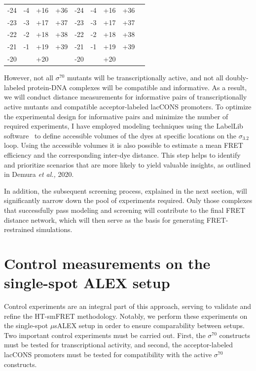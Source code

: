 \begin{table}[]
\begin{tabular}{@{}lllllllll@{}}
-24     & -4      & +16     & +36     & -24      & -4       & +16      & +36      &                         \\
-23     & -3      & +17     & +37     & -23      & -3       & +17      & +37      &                         \\
-22     & -2      & +18     & +38     & -22      & -2       & +18      & +38      &                         \\
-21     & -1      & +19     & +39     & -21      & -1       & +19      & +39      &                         \\
-20     &         & +20     &         & -20      &          & +20      &          &                         \\
\bottomrule
\end{tabular}
\end{table}

However, not all $\sigma^{70}$ mutants will be transcriptionally active, and not all doubly-labeled protein-DNA complexes will be compatible and informative. 
As a result, we will conduct distance measurements for informative pairs of transcriptionally active mutants and compatible acceptor-labeled \ac{lacCONS} promoters.
To optimize the experimental design for informative pairs and minimize the number of required experiments, I have employed modeling techniques using the LabelLib software~\cite{dimura_NatComm_2020} to define accessible volumes of the dyes at specific locations on the $\sigma_{3.2}$ loop.
Using the accessible volumes it is also possible to estimate a mean FRET efficiency and the corresponding inter-dye distance. 
This step helps to identify and prioritize scenarios that are more likely to yield valuable insights, as outlined in Demura \textit{et al.,} 2020.~\cite{dimura_NatComm_2020}

In addition, the subsequent screening process, explained in the next section, will significantly narrow down the pool of experiments required.
Only those complexes that successfully pass modeling and screening will contribute to the final FRET distance network, which will then serve as the basis for generating FRET-restrained simulations.

\section{Control measurements on the single-spot ALEX setup}
\label{se:controls_exp}

Control experiments are an integral part of this approach, serving to validate and refine the \ac{HT-smFRET} methodology. 
Notably, we perform these experiments on the single-spot $\mu$s\ac{ALEX} setup in order to ensure comparability between setups.
Two important control experiments must be carried out.
First, the $\sigma^{70}$ constructs must be tested for transcriptional activity, and second, the acceptor-labeled \ac{lacCONS} promoters must be tested for compatibility with the active $\sigma^{70}$ constructs. 

